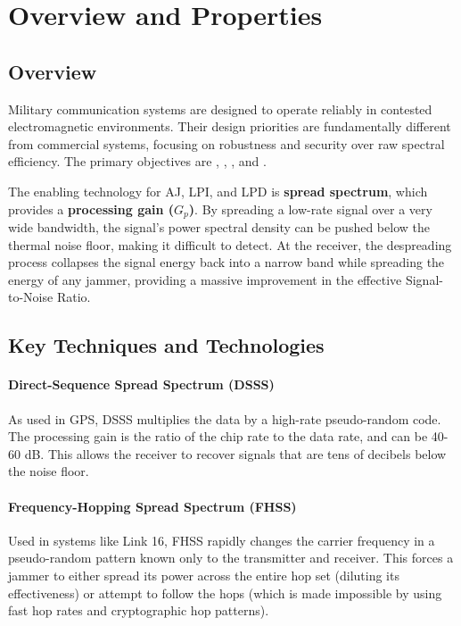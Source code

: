\section{Overview and Properties}

\subsection{Overview}

Military communication systems are designed to operate reliably in contested electromagnetic environments. Their design priorities are fundamentally different from commercial systems, focusing on robustness and security over raw spectral efficiency. The primary objectives are , , , and .

\begin{keyconcept}
    The enabling technology for AJ, LPI, and LPD is \textbf{spread spectrum}, which provides a \textbf{processing gain ($G_p$)}. By spreading a low-rate signal over a very wide bandwidth, the signal's power spectral density can be pushed below the thermal noise floor, making it difficult to detect. At the receiver, the despreading process collapses the signal energy back into a narrow band while spreading the energy of any jammer, providing a massive improvement in the effective Signal-to-Noise Ratio.
\end{keyconcept}


\subsection{Key Techniques and Technologies}

\paragraph{Direct-Sequence Spread Spectrum (DSSS)}
As used in GPS, DSSS multiplies the data by a high-rate pseudo-random code. The processing gain is the ratio of the chip rate to the data rate, and can be 40-60 dB. This allows the receiver to recover signals that are tens of decibels below the noise floor.

\paragraph{Frequency-Hopping Spread Spectrum (FHSS)}
Used in systems like Link 16, FHSS rapidly changes the carrier frequency in a pseudo-random pattern known only to the transmitter and receiver. This forces a jammer to either spread its power across the entire hop set (diluting its effectiveness) or attempt to follow the hops (which is made impossible by using fast hop rates and cryptographic hop patterns).


